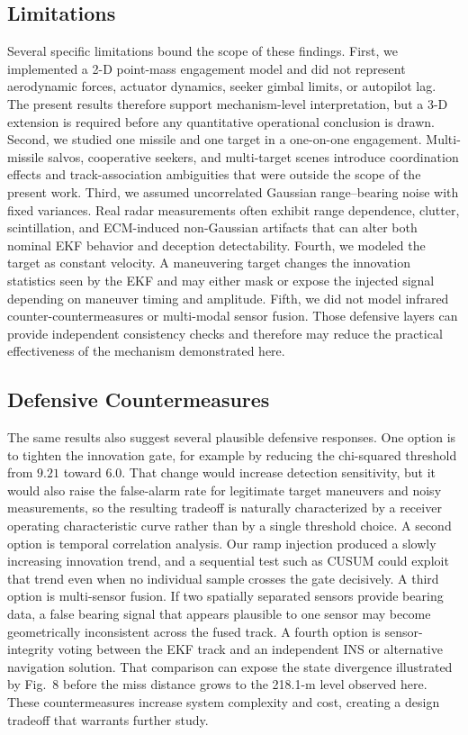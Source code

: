 \documentclass[journal]{IEEEtran}
\begin{document}
\subsection{Limitations}
Several specific limitations bound the scope of these findings.  First,
we implemented a 2-D point-mass engagement model and did not represent
aerodynamic forces, actuator dynamics, seeker gimbal limits, or
autopilot lag.  The present results therefore support mechanism-level
interpretation, but a 3-D extension is required before any quantitative
operational conclusion is drawn.  Second, we studied one missile and
one target in a one-on-one engagement.  Multi-missile salvos,
cooperative seekers, and multi-target scenes introduce coordination
effects and track-association ambiguities that were outside the scope
of the present work.  Third, we assumed uncorrelated Gaussian
range--bearing noise with fixed variances.  Real radar measurements
often exhibit range dependence, clutter, scintillation, and
ECM-induced non-Gaussian artifacts that can alter both nominal EKF
behavior and deception detectability.  Fourth, we modeled the target as
constant velocity.  A maneuvering target changes the innovation
statistics seen by the EKF and may either mask or expose the injected
signal depending on maneuver timing and amplitude.  Fifth, we did not
model infrared counter-countermeasures or multi-modal sensor fusion.
Those defensive layers can provide independent consistency checks and
therefore may reduce the practical effectiveness of the mechanism
demonstrated here.

\subsection{Defensive Countermeasures}
The same results also suggest several plausible defensive responses.
One option is to tighten the innovation gate, for example by reducing
the chi-squared threshold from $9.21$ toward $6.0$.  That change would
increase detection sensitivity, but it would also raise the false-alarm
rate for legitimate target maneuvers and noisy measurements, so the
resulting tradeoff is naturally characterized by a receiver operating
characteristic curve rather than by a single threshold choice.  A
second option is temporal correlation analysis.  Our ramp injection
produced a slowly increasing innovation trend, and a sequential test
such as CUSUM could exploit that trend even when no individual sample
crosses the gate decisively.  A third option is multi-sensor fusion.
If two spatially separated sensors provide bearing data, a false
bearing signal that appears plausible to one sensor may become
geometrically inconsistent across the fused track.  A fourth option is
sensor-integrity voting between the EKF track and an independent INS or
alternative navigation solution.  That comparison can expose the state
divergence illustrated by Fig.~8 before the miss distance grows to the
218.1-m level observed here.  These countermeasures increase system
complexity and cost, creating a design tradeoff that warrants further
study.
\end{document}
